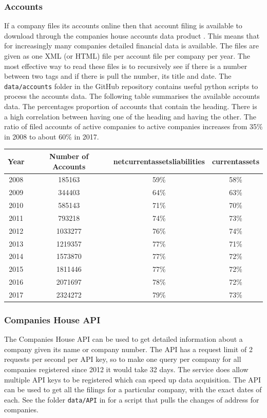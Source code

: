 \documentclass[a4paper,10pt]{article}
\begin{document}
   \subsubsection{Accounts}
   If a company files its accounts online then that account filing is available to download through the companies house accounts data product \cite{accountsdataproduct}. This means that for increasingly many companies detailed financial data is available.
   The files are given as one XML (or HTML) file per account file per company per year. The most effective way to read these files is to recursively see if there is a number between two tags and if there is pull the number, its title and date. The \texttt{data/accounts} folder in the GitHub repository \cite{github} contains useful python scripts to process the accounts data. The following table summarises the available accounts data. The percentages proportion of accounts that contain the heading. There is a high correlation between having one of the heading and having the other. The ratio of filed accounts of active companies to active companies increases from 35\% in 2008 to about 60\% in 2017.
   \begin{center}
      \begin{tabular}{  c | c | c | c  }
      Year & Number of Accounts & netcurrentassetsliabilities & currentassets \\
      \hline
      2008 & 185163  & 59\% & 58\% \\
      2009 & 344403  & 64\% & 63\% \\
      2010 & 585143  & 71\% & 70\% \\
      2011 & 793218  & 74\% & 73\% \\
      2012 & 1033277 & 76\% & 74\% \\
      2013 & 1219357 & 77\% & 71\% \\
      2014 & 1573870 & 77\% & 72\% \\
      2015 & 1811446 & 77\% & 72\% \\
      2016 & 2071697 & 78\% & 72\% \\
      2017 & 2324272 & 79\% & 73\% \\
      \end{tabular}
   \end{center}


   \subsubsection{Companies House API}
   The Companies House API \cite{companieshouseapi} can be used to get detailed information about a company given its name or company number. The API has a request limit of 2 requests per second per API key, so to make one query per company for all companies registered since 2012 it would take 32 days. The service does allow multiple API keys to be registered which can speed up data acquisition. The API can be used to get all the filings for a particular company, with the exact dates of each. See the folder \texttt{data/API} in \cite{github} for a script that pulls the changes of address for companies.
\end{document}

